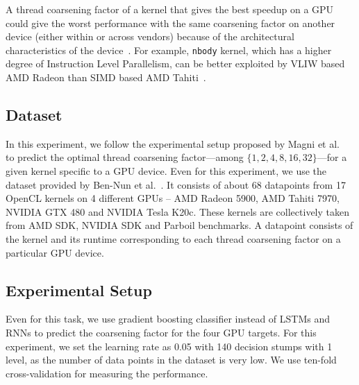 A thread coarsening factor of a kernel that gives the best speedup on a GPU could give the worst performance with the same coarsening factor on another device (either within or across vendors) because of the architectural characteristics of the device~\cite{magni2014automatic, Stawinoga-10.1145/3194242}. For example, \texttt{nbody} kernel, which has a higher degree of Instruction Level Parallelism, can be better exploited by VLIW based AMD Radeon than SIMD based AMD Tahiti~\cite{magni2014automatic}.

\subsection{Dataset} 
In this experiment, we follow the experimental setup proposed by Magni et al.~\cite{magni2014automatic} to predict the optimal thread coarsening factor---among $\{1,2,4,8,16,32\}$---for a given kernel specific to a GPU device. Even for this experiment, we use the dataset provided by Ben-Nun et al.~\cite{ncc}. It consists of about 68 datapoints from 17 OpenCL kernels on 4 different GPUs -- AMD Radeon 5900, AMD Tahiti 7970, NVIDIA GTX 480 and NVIDIA Tesla K20c.
These kernels are collectively taken from AMD SDK, NVIDIA SDK and Parboil benchmarks.
A datapoint consists of the kernel and its runtime corresponding to each thread coarsening factor on a particular GPU device.

\subsection{Experimental Setup}
Even for this task, we use gradient boosting classifier instead of LSTMs and RNNs to predict the coarsening factor for the four GPU targets. For this experiment, we set the learning rate as 0.05 with 140 decision stumps with 1 level, as the number of data points in the dataset is very low. We use ten-fold cross-validation for measuring the performance.

